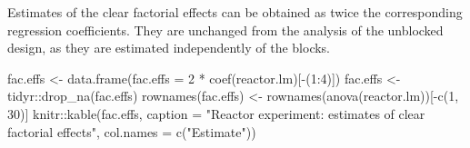 \documentclass[
]{book}
\newenvironment{Shaded}{\begin{snugshade}}{\end{snugshade}}
\newcommand{\AttributeTok}[1]{\textcolor[rgb]{0.77,0.63,0.00}{#1}}
\newcommand{\DecValTok}[1]{\textcolor[rgb]{0.00,0.00,0.81}{#1}}
\newcommand{\FunctionTok}[1]{\textcolor[rgb]{0.00,0.00,0.00}{#1}}
\newcommand{\NormalTok}[1]{#1}
\newcommand{\OtherTok}[1]{\textcolor[rgb]{0.56,0.35,0.01}{#1}}
\newcommand{\SpecialCharTok}[1]{\textcolor[rgb]{0.00,0.00,0.00}{#1}}
\newcommand{\StringTok}[1]{\textcolor[rgb]{0.31,0.60,0.02}{#1}}
\theoremstyle{definition}
\theoremstyle{definition}
\theoremstyle{definition}
\theoremstyle{definition}
\theoremstyle{remark}
\begin{document}
Estimates of the clear factorial effects can be obtained as twice the corresponding regression coefficients. They are unchanged from the analysis of the unblocked design, as they are estimated independently of the blocks.

\begin{Shaded}
\begin{Highlighting}[]
\NormalTok{fac.effs }\OtherTok{\textless{}{-}} \FunctionTok{data.frame}\NormalTok{(}\AttributeTok{fac.effs =} \DecValTok{2} \SpecialCharTok{*} \FunctionTok{coef}\NormalTok{(reactor.lm)[}\SpecialCharTok{{-}}\NormalTok{(}\DecValTok{1}\SpecialCharTok{:}\DecValTok{4}\NormalTok{)])}
\NormalTok{fac.effs }\OtherTok{\textless{}{-}}\NormalTok{ tidyr}\SpecialCharTok{::}\FunctionTok{drop\_na}\NormalTok{(fac.effs)}
\FunctionTok{rownames}\NormalTok{(fac.effs) }\OtherTok{\textless{}{-}} \FunctionTok{rownames}\NormalTok{(}\FunctionTok{anova}\NormalTok{(reactor.lm))[}\SpecialCharTok{{-}}\FunctionTok{c}\NormalTok{(}\DecValTok{1}\NormalTok{, }\DecValTok{30}\NormalTok{)]}
\NormalTok{knitr}\SpecialCharTok{::}\FunctionTok{kable}\NormalTok{(fac.effs, }\AttributeTok{caption =} \StringTok{"Reactor experiment: estimates of clear factorial effects"}\NormalTok{, }\AttributeTok{col.names =} \FunctionTok{c}\NormalTok{(}\StringTok{"Estimate"}\NormalTok{))}
\end{Highlighting}
\end{Shaded}
\end{document}
